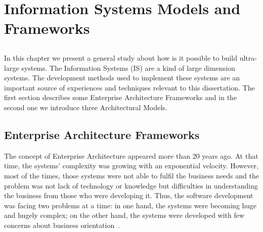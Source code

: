 \chapter{Information Systems Models and Frameworks} \label{chap:inf-sys}

\section*{}

%


%
%
%
%

In this chapter we present a general study about how is it possible to build ultra-large systems. The Information Systems (IS) are a kind of large dimension systems. The development methods used to implement these systems are an important source of experiences and techniques relevant to this dissertation. The first section describes some Enterprise Architecture Frameworks and in the second one we introduce three Architectural Models.


\section{Enterprise Architecture Frameworks} \label{sec:ea-frams}
The concept of Enterprise Architecture appeared more than 20 years ago. At that time, the systems' complexity was growing with an exponential velocity. However, most of the times, those systems were not able to fulfil the business needs and the problem was not lack of technology or knowledge but difficulties in understanding the business from those who were developing it. Thus, the software development was facing two problems at a time: in one hand, the systems were becoming huge and hugely complex; on the other hand, the systems were developed with few concerns about business orientation~\citep{Sessions2007}.

